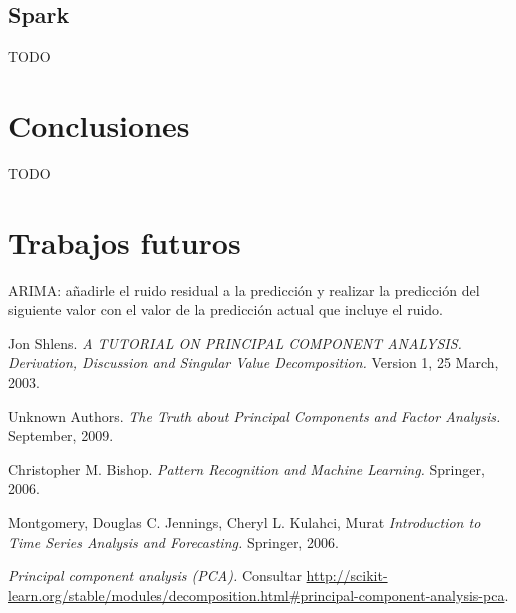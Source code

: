 \documentclass[11pt,spanish,listoffigures,listoftables]{tfgetsinf}
\begin{document}
        \section{Spark}
        TODO
 
\chapter{Conclusiones}
TODO

\chapter{Trabajos futuros}

ARIMA: añadirle el ruido residual a la predicción y realizar la predicción del siguiente valor con el valor de la predicción actual que incluye el ruido.

\begin{thebibliography}{10}

   Jon Shlens.
   \newblock \textit{A TUTORIAL ON PRINCIPAL COMPONENT ANALYSIS. Derivation, Discussion and Singular Value Decomposition.}
   \newblock Version 1, 25 March, 2003.

   Unknown Authors.
   \newblock \textit{The Truth about Principal Components and Factor Analysis.}
    September, 2009.
   
   Christopher M. Bishop.
   \newblock \textit{Pattern Recognition and Machine Learning.}
   \newblock Springer, 2006.

   Montgomery, Douglas C.
   Jennings, Cheryl L.
   Kulahci, Murat
   \newblock \textit{Introduction to Time Series Analysis and Forecasting.}
   \newblock Springer, 2006.

   \textit{Principal component analysis (PCA).}
   \newblock Consultar 
   \url{http://scikit-learn.org/stable/modules/decomposition.html#principal-component-analysis-pca}.

\end{thebibliography}
\cleardoublepage

%
\end{document}
